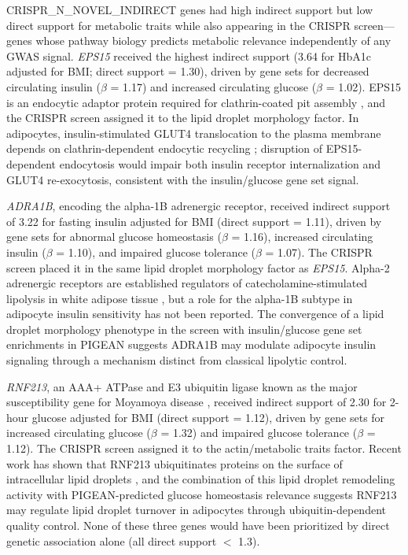 {{CRISPR_N_NOVEL_INDIRECT}} genes had high indirect support but low direct support for metabolic traits while also appearing in the CRISPR screen---genes whose pathway biology predicts metabolic relevance independently of any GWAS signal. \textit{EPS15} received the highest indirect support (3.64 for HbA1c adjusted for BMI; direct support = 1.30), driven by gene sets for decreased circulating insulin ($\beta$ = 1.17) and increased circulating glucose ($\beta$ = 1.02). EPS15 is an endocytic adaptor protein required for clathrin-coated pit assembly \cite{vanbergen_eps15_1995}, and the CRISPR screen assigned it to the lipid droplet morphology factor. In adipocytes, insulin-stimulated GLUT4 translocation to the plasma membrane depends on clathrin-dependent endocytic recycling \cite{leto_regulation_2012}; disruption of EPS15-dependent endocytosis would impair both insulin receptor internalization and GLUT4 re-exocytosis, consistent with the insulin/glucose gene set signal.

\textit{ADRA1B}, encoding the alpha-1B adrenergic receptor, received indirect support of 3.22 for fasting insulin adjusted for BMI (direct support = 1.11), driven by gene sets for abnormal glucose homeostasis ($\beta$ = 1.16), increased circulating insulin ($\beta$ = 1.10), and impaired glucose tolerance ($\beta$ = 1.07). The CRISPR screen placed it in the same lipid droplet morphology factor as \textit{EPS15}. Alpha-2 adrenergic receptors are established regulators of catecholamine-stimulated lipolysis in white adipose tissue \cite{lafontan_fat_2009, bartness_sympathetic_2014}, but a role for the alpha-1B subtype in adipocyte insulin sensitivity has not been reported. The convergence of a lipid droplet morphology phenotype in the screen with insulin/glucose gene set enrichments in PIGEAN suggests ADRA1B may modulate adipocyte insulin signaling through a mechanism distinct from classical lipolytic control.

\textit{RNF213}, an AAA+ ATPase and E3 ubiquitin ligase known as the major susceptibility gene for Moyamoya disease \cite{sugihara_rnf213_2019}, received indirect support of 2.30 for 2-hour glucose adjusted for BMI (direct support = 1.12), driven by gene sets for increased circulating glucose ($\beta$ = 1.32) and impaired glucose tolerance ($\beta$ = 1.12). The CRISPR screen assigned it to the actin/metabolic traits factor. Recent work has shown that RNF213 ubiquitinates proteins on the surface of intracellular lipid droplets \cite{ahel_rnf213_2023}, and the combination of this lipid droplet remodeling activity with PIGEAN-predicted glucose homeostasis relevance suggests RNF213 may regulate lipid droplet turnover in adipocytes through ubiquitin-dependent quality control. None of these three genes would have been prioritized by direct genetic association alone (all direct support $<$ 1.3).

